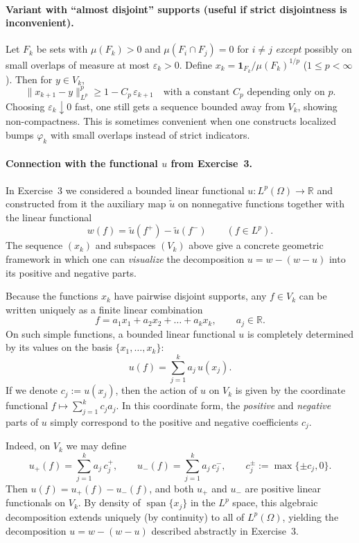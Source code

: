 \documentclass[12pt,a4paper]{article}
\theoremstyle{plain}
\theoremstyle{definition}
\theoremstyle{remark}
\theoremstyle{remark}
\theoremstyle{definition}
\begin{document}
	\paragraph{Variant with ``almost disjoint'' supports (useful if strict disjointness is inconvenient).}
	Let $F_k$ be sets with $\mu(F_k)>0$ and $\mu(F_i\cap F_j)=0$ for $i\neq j$ \emph{except} possibly on
	small overlaps of measure at most $\varepsilon_k>0$. Define
	$x_k=\mathbf{1}_{F_k}/\mu(F_k)^{1/p}$ ($1\le p<\infty$).
	Then for $y\in V_k$,
	\[
	\|x_{k+1}-y\|_{L^p}^p
	\ge 1 - C_p\,\varepsilon_{k+1}
	\quad\text{with a constant }C_p \text{ depending only on }p.
	\]
	Choosing $\varepsilon_{k}\downarrow0$ fast, one still gets a sequence bounded away from $V_k$,
	showing non-compactness. This is sometimes convenient when one constructs localized bumps $\varphi_k$
	with small overlaps instead of strict indicators.
	
	\bigskip
	\paragraph{Connection with the functional $u$ from Exercise~3.}
	
	\noindent
	In Exercise~3 we considered a bounded linear functional
	$u:L^{p}(\Omega)\to\mathbb{R}$ and constructed from it the auxiliary map
	$\tilde u$ on nonnegative functions together with the linear functional
	\[
	w(f)=\tilde u(f^{+})-\tilde u(f^{-})
	\qquad (f\in L^{p}).
	\]
	The sequence $(x_k)$ and subspaces $(V_k)$ above give a concrete geometric
	framework in which one can \emph{visualize} the decomposition $u=w-(w-u)$
	into its positive and negative parts.
	
	\medskip
	
	\noindent
	Because the functions $x_k$ have pairwise disjoint supports, any
	$f\in V_k$ can be written uniquely as a finite linear combination
	\[
	f = a_1 x_1 + a_2 x_2 + \dots + a_k x_k,
	\qquad  a_j\in\mathbb{R}.
	\]
	On such simple functions, a bounded linear functional $u$
	is completely determined by its values on the basis $\{x_1,\dots,x_k\}$:
	\[
	u(f) = \sum_{j=1}^{k} a_j\,u(x_j).
	\]
	If we denote $c_j:=u(x_j)$, then the action of $u$ on $V_k$
	is given by the coordinate functional
	$f\mapsto\sum_{j=1}^{k} c_j a_j$.
	In this coordinate form, the \emph{positive} and \emph{negative} parts
	of $u$ simply correspond to the positive and negative coefficients $c_j$.
	
	\medskip
	
	\noindent
	Indeed, on $V_k$ we may define
	\[
	u_{+}(f)
	= \sum_{j=1}^{k} a_j\,c_j^{+},
	\qquad
	u_{-}(f)
	= \sum_{j=1}^{k} a_j\,c_j^{-},
	\qquad
	c_j^{\pm} := \max\{\pm c_j,0\}.
	\]
	Then $u(f)=u_{+}(f)-u_{-}(f)$, and both $u_{+}$ and $u_{-}$ are
	positive linear functionals on $V_k$.
	By density of $\operatorname{span}\{x_j\}$ in the $L^{p}$ space,
	this algebraic decomposition extends uniquely (by continuity) to
	all of $L^{p}(\Omega)$, yielding the decomposition $u=w-(w-u)$
	described abstractly in Exercise~3.
	
\end{document}
